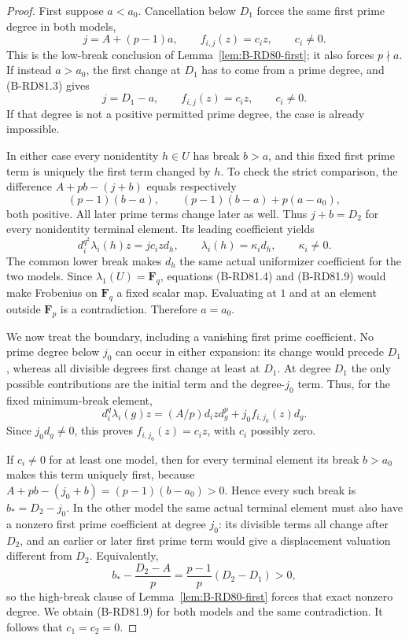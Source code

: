 \begin{proof}
First suppose \(a<a_0\). Cancellation below \(D_1\)
forces the same first prime degree in both models,
\[
                  j=A+(p-1)a,
          \qquad f_{i,j}(z)=c_i z,
          \qquad c_i\ne0.                            \tag{B-RD81.6}
\]
This is the low-break conclusion of
Lemma~\ref{lem:B-RD80-first}; it also forces \(p\nmid a\).
If instead \(a>a_0\), the first change at \(D_1\) has to
come from a prime degree, and (B-RD81.3) gives
\[
                 j=D_1-a,
          \qquad f_{i,j}(z)=c_i z,
          \qquad c_i\ne0.                            \tag{B-RD81.7}
\]
If that degree is not a positive permitted prime degree, the
case is already impossible.

In either case every nonidentity \(h\in U\) has break
\(b>a\), and this fixed first prime term is uniquely the
first term changed by \(h\). To check the strict comparison,
the difference \(A+pb-(j+b)\) equals respectively
\[
 (p-1)(b-a),\qquad
 (p-1)(b-a)+p(a-a_0),                                \tag{B-RD81.8}
\]
both positive. All later prime terms change later as well.
Thus \(j+b=D_2\) for every nonidentity terminal element.
Its leading coefficient yields
\[
      d_i^{q^2}\lambda_i(h)z=j c_i z d_h,
      \qquad \lambda_i(h)=\kappa_i d_h,
      \qquad \kappa_i\ne0.                           \tag{B-RD81.9}
\]
The common lower break makes \(d_h\) the same actual
uniformizer coefficient for the two models. Since
\(\lambda_1(U)=\mathbf F_q\), equations (B-RD81.4) and
(B-RD81.9) would make Frobenius on \(\mathbf F_q\) a fixed
scalar map. Evaluating at \(1\) and at an element outside
\(\mathbf F_p\) is a contradiction. Therefore \(a=a_0\).

We now treat the boundary, including a vanishing first prime
coefficient. No prime degree below \(j_0\) can occur in
either expansion: its change would precede \(D_1\), whereas
all divisible degrees first change at least at \(D_1\).
At degree \(D_1\) the only possible contributions are
the initial term and the degree-\(j_0\) term. Thus, for
the fixed minimum-break element,
\[
 d_i^q\lambda_i(g)z
   =(A/p)d_i z d_g^p+j_0 f_{i,j_0}(z)d_g.             \tag{B-RD81.10}
\]
Since \(j_0d_g\ne0\), this proves
\(f_{i,j_0}(z)=c_i z\), with \(c_i\) possibly zero.

If \(c_i\ne0\) for at least one model, then for every
terminal element its break \(b>a_0\) makes this term
uniquely first, because
\(A+pb-(j_0+b)=(p-1)(b-a_0)>0\). Hence every such
break is \(b_*=D_2-j_0\). In the other model the same
actual terminal element must also have a nonzero first
prime coefficient at degree \(j_0\): its divisible terms
all change after \(D_2\), and an earlier or later first
prime term would give a displacement valuation different
from \(D_2\). Equivalently,
\[
 b_*-\frac{D_2-A}{p}
       =\frac{p-1}{p}(D_2-D_1)>0,                    \tag{B-RD81.11}
\]
so the high-break clause of Lemma~\ref{lem:B-RD80-first}
forces that exact nonzero degree. We obtain (B-RD81.9)
for both models and the same contradiction. It follows
that \(c_1=c_2=0\).


\end{proof}
